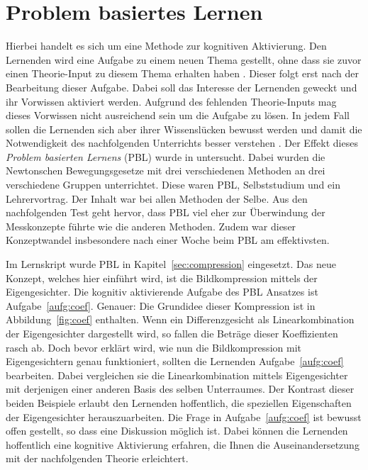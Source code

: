 \section{Problem basiertes Lernen}
Hierbei handelt es sich um eine Methode zur kognitiven Aktivierung.
Den Lernenden wird eine Aufgabe zu einem neuen Thema gestellt, ohne dass sie zuvor einen Theorie-Input zu diesem Thema erhalten haben \cite{Loyens2015}.
Dieser folgt erst nach der Bearbeitung dieser Aufgabe.
Dabei soll das Interesse der Lernenden geweckt und ihr Vorwissen aktiviert werden.
Aufgrund des fehlenden Theorie-Inputs mag dieses Vorwissen nicht ausreichend sein um die Aufgabe zu lösen.
In jedem Fall sollen die Lernenden sich aber ihrer Wissenslücken bewusst werden und damit die Notwendigkeit des nachfolgenden Unterrichts besser verstehen \cite{Loyens2015}.
Der Effekt dieses \textit{Problem basierten Lernens} (PBL) wurde in \cite{Loyens2015} untersucht.
Dabei wurden die Newtonschen Bewegungsgesetze mit drei verschiedenen Methoden an drei verschiedene Gruppen unterrichtet.
Diese waren PBL, Selbststudium und ein Lehrervortrag.
Der Inhalt war bei allen Methoden der Selbe.
Aus den nachfolgenden Test geht hervor, dass PBL viel eher zur Überwindung der Messkonzepte führte wie die anderen Methoden.
Zudem war dieser Konzeptwandel insbesondere nach einer Woche beim PBL am effektivsten.

Im Lernskript wurde PBL in Kapitel~\ref{sec:compression} eingesetzt.
Das neue Konzept, welches hier einführt wird, ist die Bildkompression mittels der Eigengesichter.
Die kognitiv aktivierende Aufgabe des PBL Ansatzes ist Aufgabe~\ref{aufg:coef}.
Genauer: Die Grundidee dieser Kompression ist in Abbildung~\ref{fig:coef} enthalten.
Wenn ein Differenzgesicht als Linearkombination der Eigengesichter dargestellt wird, so fallen die Beträge dieser Koeffizienten rasch ab.
Doch bevor erklärt wird, wie nun die Bildkompression mit Eigengesichtern genau funktioniert, sollten die Lernenden Aufgabe~\ref{aufg:coef} bearbeiten.
Dabei vergleichen sie die Linearkombination mittels Eigengesichter mit derjenigen einer anderen Basis des selben Unterraumes.
Der Kontrast dieser beiden Beispiele erlaubt den Lernenden hoffentlich, die speziellen Eigenschaften der Eigengesichter herauszuarbeiten.
Die Frage in Aufgabe~\ref{aufg:coef} ist bewusst offen gestellt, so dass eine Diskussion möglich ist.
Dabei können die Lernenden hoffentlich eine kognitive Aktivierung erfahren, die Ihnen die Auseinandersetzung mit der nachfolgenden Theorie erleichtert.